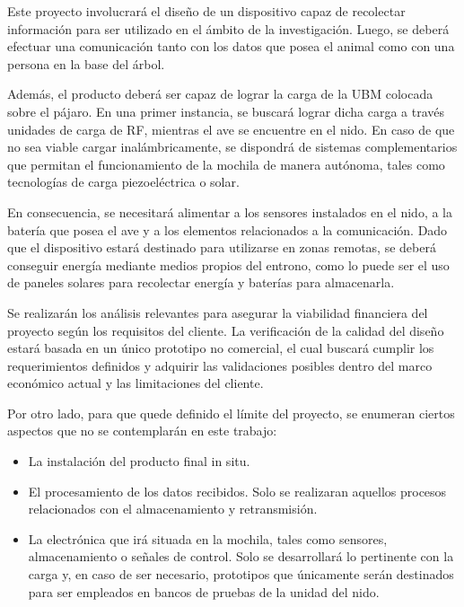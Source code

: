 Este proyecto involucrará el diseño de un dispositivo capaz de recolectar información para ser utilizado en el ámbito de la investigación. Luego, se deberá efectuar una comunicación tanto con los datos que posea el animal como con una persona en la base del árbol.

Además, el producto deberá ser capaz de lograr la carga de la UBM colocada sobre el pájaro. En una primer instancia, se buscará lograr dicha carga a través unidades de carga de RF, mientras el ave se encuentre en el nido. En caso de que no sea viable cargar inalámbricamente, se dispondrá de sistemas complementarios que permitan el funcionamiento de la mochila de manera autónoma, tales como tecnologías de carga piezoeléctrica o solar. 

En consecuencia, se necesitará alimentar a los sensores instalados en el nido, a la batería que posea el ave y a los elementos relacionados a la comunicación. Dado que el dispositivo estará destinado para utilizarse en zonas remotas, se deberá conseguir energía mediante medios propios del entrono, como lo puede ser el uso de paneles solares para recolectar energía y baterías para almacenarla.

Se realizarán los análisis relevantes para asegurar la viabilidad financiera del proyecto según los requisitos del cliente. La verificación de la calidad del diseño estará basada en un único prototipo no comercial, el cual buscará cumplir los requerimientos definidos y adquirir las validaciones posibles dentro del marco económico actual y las limitaciones del cliente. 


Por otro lado, para que quede definido el límite del proyecto, se enumeran ciertos aspectos que no se contemplarán en este trabajo:
\begin{itemize}
	\item La instalación del producto final in situ.
	\item El procesamiento de los datos recibidos. Solo se realizaran aquellos procesos relacionados con el almacenamiento y retransmisión.
	\item La electrónica que irá situada en la mochila, tales como sensores, almacenamiento o señales de control. Solo se desarrollará lo pertinente con la carga y, en caso de ser necesario, prototipos que únicamente serán destinados para ser empleados en bancos de pruebas de la unidad del nido. 
\end{itemize}

